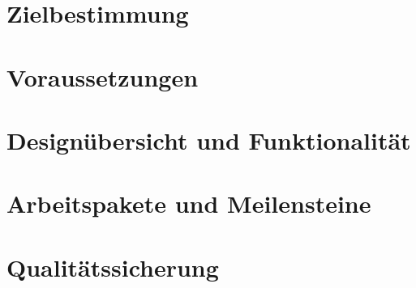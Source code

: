 \section{Zielbestimmung}

\section{Voraussetzungen}

\section{Designübersicht und Funktionalität}

\section{Arbeitspakete und Meilensteine}

\section{Qualitätssicherung}



